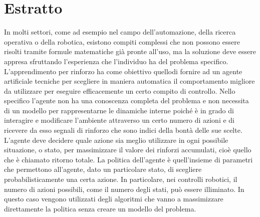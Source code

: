 \newcommand{\estrattoname}{Estratto}
\addcontentsline{toc}{chapter}{\estrattoname}

\begingroup
\let\clearpage\relax
\let\cleardoublepage\relax
\let\cleardoublepage\relax

\chapter*{Estratto}
In molti settori, come ad esempio nel campo dell'automazione, della ricerca operativa o della robotica, esistono compiti complessi che non possono essere risolti tramite formule matematiche già pronte all'uso, ma la soluzione deve essere appresa sfruttando l'esperienza che l'individuo ha del problema specifico.
 L'apprendimento per rinforzo ha come obiettivo quellodi fornire ad un agente artificiale tecniche per scegliere in maniera automatica il comportamento migliore da utilizzare per eseguire efficacemente un certo compito di controllo. Nello specifico l'agente non ha una conoscenza completa del problema e non necessita di un modello per rappresentarne le dinamiche interne poiché è in grado di interagire e modificare l'ambiente attraverso un certo numero di azioni e di ricevere da esso segnali di rinforzo che sono indici della bontà delle sue scelte.
L'agente deve decidere quale azione sia meglio utilizzare in ogni possibile situazione, o stato, per massimizzare il valore dei rinforzi accumulati, cioè quello che è chiamato ritorno totale.
La politica dell'agente è quell'insieme di parametri che permettono all'agente, dato un particolare stato, di scegliere probabilisticamente una certa azione.
In particolare, nei controlli robotici, il numero di azioni possibili, come il numero degli stati, può essere illiminato. 
In questo caso vengono utilizzati degli algoritmi che vanno a massimizzare direttamente la politica senza creare un modello del problema.

\endgroup

